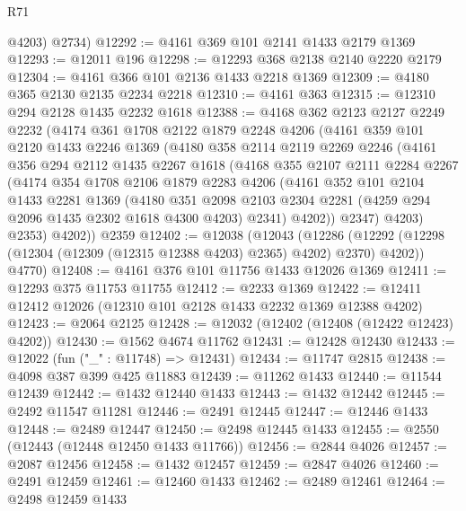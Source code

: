 \begin{lexlean}{R71}
\begin{coremodule}
        @4203)
      @2734)
@12292 := @4161 @369 @101 @2141 @1433 @2179 @1369
@12293 := @12011 @196
@12298 := @12293 @368 @2138 @2140 @2220 @2179
@12304 := @4161 @366 @101 @2136 @1433 @2218 @1369
@12309 := @4180 @365 @2130 @2135 @2234 @2218
@12310 := @4161 @363
@12315 := @12310 @294 @2128 @1435 @2232 @1618
@12388 := @4168
    @362
    @2123
    @2127
    @2249
    @2232
    (@4174
      @361
      @1708
      @2122
      @1879
      @2248
      @4206
      (@4161
        @359
        @101
        @2120
        @1433
        @2246
        @1369
        (@4180
          @358
          @2114
          @2119
          @2269
          @2246
          (@4161
            @356
            @294
            @2112
            @1435
            @2267
            @1618
            (@4168
              @355
              @2107
              @2111
              @2284
              @2267
              (@4174
                @354
                @1708
                @2106
                @1879
                @2283
                @4206
                (@4161
                  @352
                  @101
                  @2104
                  @1433
                  @2281
                  @1369
                  (@4180
                    @351
                    @2098
                    @2103
                    @2304
                    @2281
                    (@4259 @294 @2096 @1435 @2302 @1618 @4300 @4203)
                    @2341)
                  @4202))
              @2347)
            @4203)
          @2353)
        @4202))
    @2359
@12402 := @12038
    (@12043
      (@12286 (@12292 (@12298 (@12304 (@12309 (@12315 @12388 @4203) @2365) @4202) @2370) @4202))
      @4770)
@12408 := @4161 @376 @101 @11756 @1433 @12026 @1369
@12411 := @12293 @375 @11753 @11755
@12412 := @2233 @1369
@12422 := @12411 @12412 @12026 (@12310 @101 @2128 @1433 @2232 @1369 @12388 @4202)
@12423 := @2064 @2125
@12428 := @12032 (@12402 (@12408 (@12422 @12423) @4202))
@12430 := @1562 @4674 @11762
@12431 := @12428 @12430
@12433 := @12022 (fun ("_" : @11748) => @12431)
@12434 := @11747 @2815
@12438 := @4098 @387 @399 @425 @11883
@12439 := @11262 @1433
@12440 := @11544 @12439
@12442 := @1432 @12440 @1433
@12443 := @1432 @12442
@12445 := @2492 @11547 @11281
@12446 := @2491 @12445
@12447 := @12446 @1433
@12448 := @2489 @12447
@12450 := @2498 @12445 @1433
@12455 := @2550 (@12443 (@12448 @12450 @1433 @11766))
@12456 := @2844 @4026
@12457 := @2087 @12456
@12458 := @1432 @12457
@12459 := @2847 @4026
@12460 := @2491 @12459
@12461 := @12460 @1433
@12462 := @2489 @12461
@12464 := @2498 @12459 @1433

\end{coremodule}
\end{lexlean}
